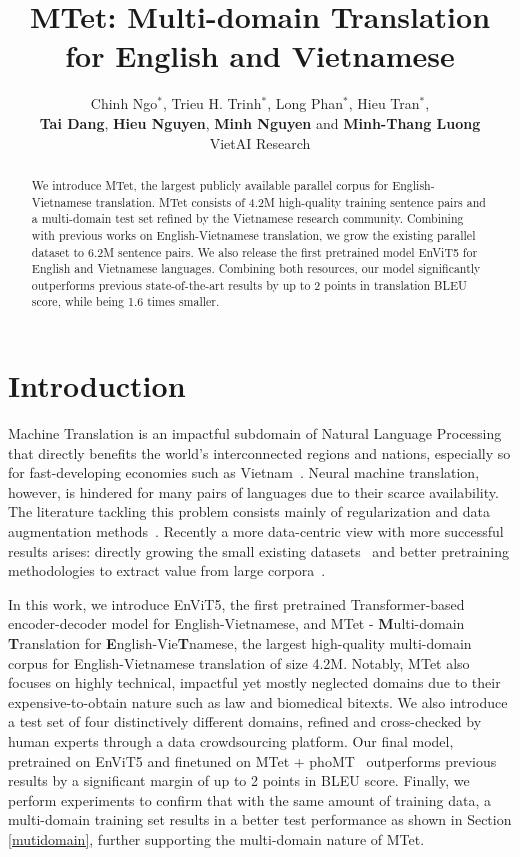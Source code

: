 \documentclass[11pt]{article}
\title{MTet: Multi-domain Translation for English and Vietnamese}
\author{Chinh Ngo$^*$, Trieu H. Trinh$^*$, Long Phan$^*$, Hieu Tran$^*$, 
        \\ {\bf Tai Dang}, {\bf Hieu Nguyen}, {\bf Minh Nguyen} and {\bf Minh-Thang Luong}\\
        VietAI Research}
\begin{document}
\maketitle
\def\thefootnote{*}\def\thefootnote{\arabic{footnote}}
\begin{abstract}
We introduce MTet, the largest publicly available parallel corpus for English-Vietnamese translation. MTet consists of 4.2M high-quality training sentence pairs and a multi-domain test set refined by the Vietnamese research community. Combining with previous works on English-Vietnamese translation, we grow the existing parallel dataset to 6.2M sentence pairs. We also release the first pretrained model EnViT5 for English and Vietnamese languages. Combining both resources, our model significantly outperforms previous state-of-the-art results by up to 2 points in translation BLEU score, while being 1.6 times smaller.
\end{abstract}

\section{Introduction}
Machine Translation is an impactful subdomain of Natural Language Processing that directly benefits the world's interconnected regions and nations, especially so for fast-developing economies such as Vietnam~\cite{vietnamworkingpaper}. Neural machine translation, however, is hindered for many pairs of languages due to their scarce availability. The literature tackling this problem consists mainly of regularization and data augmentation methods~\cite{bpedrop,toan19transformers,kevin18semi}. Recently a more data-centric view with more successful results arises: directly growing the small existing datasets~\citep{m2m100,sat2021ngo,cruz2021improving} and better pretraining methodologies to extract value from large corpora~\citep{mbart,lample2019xlm,song2019mass}.

In this work, we introduce EnViT5, the first pretrained Transformer-based encoder-decoder model for English-Vietnamese, and MTet - \textbf{M}ulti-domain \textbf{T}ranslation for \textbf{E}nglish-Vie\textbf{T}namese, the largest high-quality multi-domain corpus for English-Vietnamese translation of size 4.2M. 
Notably, MTet also focuses on highly technical, impactful yet mostly neglected domains due to their expensive-to-obtain nature such as law and biomedical bitexts. We also introduce a test set of four distinctively different domains, refined and cross-checked by human experts through a data crowdsourcing platform. Our final model, pretrained on EnViT5 and finetuned on MTet + phoMT~\cite{doan-etal-2021-phomt} outperforms previous results by a significant margin of up to 2 points in BLEU score. Finally, we perform experiments to confirm that with the same amount of training data, a multi-domain training set results in a better test performance as shown in Section \ref{mutidomain}, further supporting the multi-domain nature of MTet.
\end{document}
